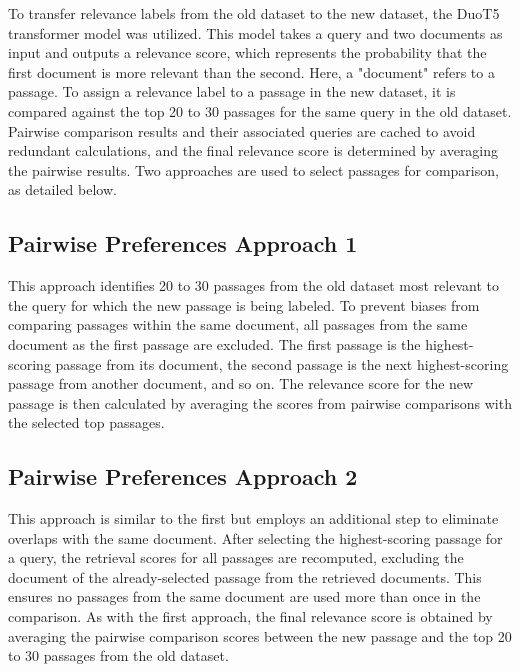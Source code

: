 To transfer relevance labels from the old dataset to the new dataset, the DuoT5 transformer model was utilized. This model takes a query and two documents as input and outputs a relevance score, which represents the probability that the first document is more relevant than the second. Here, a "document" refers to a passage. To assign a relevance label to a passage in the new dataset, it is compared against the top 20 to 30 passages for the same query in the old dataset. Pairwise comparison results and their associated queries are cached to avoid redundant calculations, and the final relevance score is determined by averaging the pairwise results. Two approaches are used to select passages for comparison, as detailed below.

\subsection{Pairwise Preferences Approach 1}\label{pairwise-preferences-approach-1}

This approach identifies 20 to 30 passages from the old dataset most relevant to the query for which the new passage is being labeled. To prevent biases from comparing passages within the same document, all passages from the same document as the first passage are excluded. The first passage is the highest-scoring passage from its document, the second passage is the next highest-scoring passage from another document, and so on. The relevance score for the new passage is then calculated by averaging the scores from pairwise comparisons with the selected top passages.

\subsection{Pairwise Preferences Approach 2}\label{pairwise-preferences-approach-2}

This approach is similar to the first but employs an additional step to eliminate overlaps with the same document. After selecting the highest-scoring passage for a query, the retrieval scores for all passages are recomputed, excluding the document of the already-selected passage from the retrieved documents. This ensures no passages from the same document are used more than once in the comparison. As with the first approach, the final relevance score is obtained by averaging the pairwise comparison scores between the new passage and the top 20 to 30 passages from the old dataset.